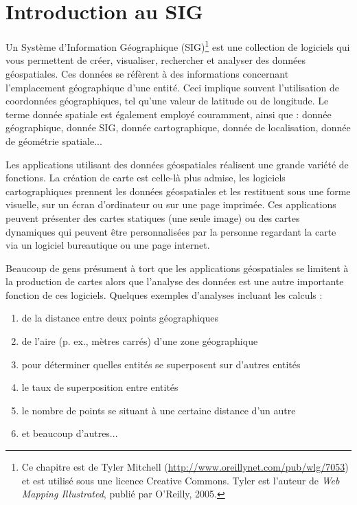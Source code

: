 \section{Introduction au SIG}\label{label_intro} 

Un Système d'Information Géographique (SIG)\cite{mitchel05}\footnote{Ce chapitre est de Tyler Mitchell (\url{http://www.oreillynet.com/pub/wlg/7053}) et est utilisé sous une licence Creative Commons. Tyler est l'auteur de \textit{Web Mapping Illustrated}, publié par O'Reilly, 2005.} est une collection de logiciels qui vous permettent de créer, visualiser, rechercher et analyser des données géospatiales. Ces données se réfèrent à des informations concernant l'emplacement géographique d'une entité. Ceci implique souvent l'utilisation de coordonnées géographiques, tel qu'une valeur de latitude ou de longitude. Le terme donnée spatiale est également employé couramment, ainsi que : donnée géographique, donnée SIG, donnée cartographique, donnée de localisation, donnée de géométrie spatiale...

Les applications utilisant des données géospatiales réalisent une grande variété de fonctions. La création de carte est celle-là plus admise, les logiciels cartographiques prennent les données géospatiales et les restituent sous une forme visuelle, sur un écran d'ordinateur ou sur une page imprimée.
Ces applications peuvent présenter des cartes statiques (une seule image) ou des cartes dynamiques qui peuvent être personnalisées par la personne regardant la carte via un logiciel bureautique ou une page internet.

Beaucoup de gens présument à tort que les applications géospatiales se limitent à la production de cartes alors que l'analyse des données est une autre importante fonction de ces logiciels. Quelques exemples d'analyses incluant les calculs : 

\begin{enumerate} 
\item de la distance entre deux points géographiques  
\item de l'aire (p. ex., mètres carrés) d'une zone géographique 
\item pour déterminer quelles entités se superposent sur d'autres entités 
\item le taux de superposition entre entités 
\item le nombre de points se situant à une certaine distance d'un autre 
\item et beaucoup d'autres...
\end{enumerate} 

